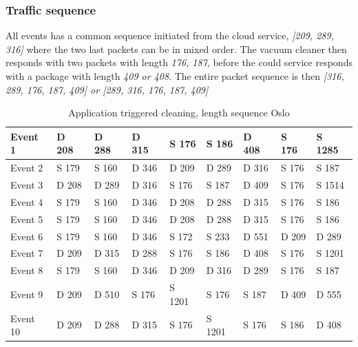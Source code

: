 \subsubsection{Traffic sequence}
All events has a common sequence initiated from the cloud service, \textit{[209, 289, 316]} where the two last packets can be in mixed order. The vacuum cleaner then responds with two packets with length \textit{176, 187}, before the could service responds with a package with length \textit{409 or 408}. The entire packet sequence is then \textit{[316, 289, 176, 187, 409] or [289, 316, 176, 187, 409]
}

\begin{table}[H]
\centering
\caption{Application triggered cleaning, length sequence Oslo}
\label{tab:ACSequenceOslo}
\begin{tabular}{|l|l|l|l|l|l|l|l|l|}
\hline
Event 1  & D 208 & D 288 & D 315 & S 176  & S 186  & D 408 & S 176 & S 1285 \\ \hline
Event 2  & S 179 & S 160 & D 346 & D 209  & D 289  & D 316 & S 176 & S 187  \\ \hline
Event 3  & D 208 & D 289 & D 316 & S 176  & S 187  & D 409 & S 176 & S 1514 \\ \hline
Event 4  & S 179 & S 160 & D 346 & D 208  & D 288  & D 315 & S 176 & S 186  \\ \hline
Event 5  & S 179 & S 160 & D 346 & D 208  & D 288  & D 315 & S 176 & S 186  \\ \hline
Event 6  & S 179 & S 160 & D 346 & S 172  & S 233  & D 551 & D 209 & D 289  \\ \hline
Event 7  & D 209 & D 315 & D 288 & S 176  & S 186  & D 408 & S 176 & S 1201 \\ \hline
Event 8  & S 179 & S 160 & D 346 & D 209  & D 316  & D 289 & S 176 & S 187  \\ \hline
Event 9  & D 209 & D 510 & S 176 & S 1201 & S 176  & S 187 & D 409 & D 555  \\ \hline
Event 10 & D 209 & D 288 & D 315 & S 176  & S 1201 & S 176 & S 186 & D 408  \\ \hline
\end{tabular}
\end{table}


